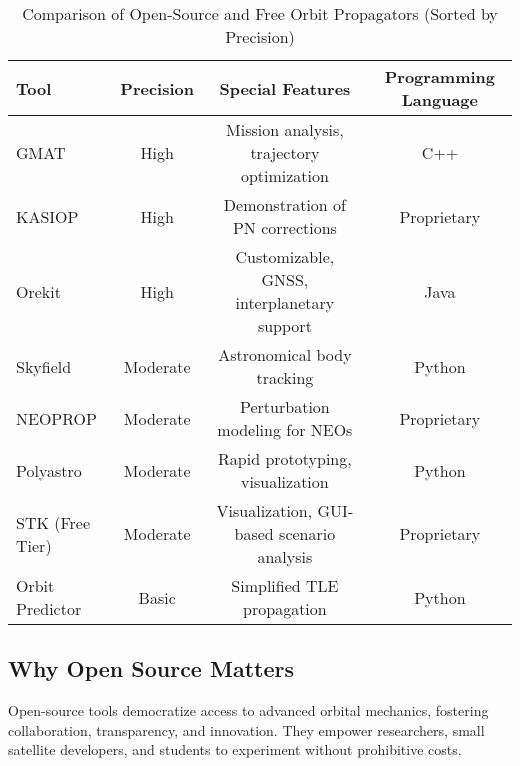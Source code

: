 
\begin{landscape}
\begin{table}[htbp]
\centering
\begin{tabular}{lccc}
\textbf{Tool} & \textbf{Precision} & \textbf{Special Features} & \textbf{Programming Language} \\
\hline
GMAT & High & Mission analysis, trajectory optimization & C++ \\
KASIOP & High & Demonstration of PN corrections & Proprietary \\
Orekit & High & Customizable, GNSS, interplanetary support & Java \\
Skyfield & Moderate & Astronomical body tracking & Python \\
NEOPROP & Moderate & Perturbation modeling for NEOs & Proprietary \\
Polyastro & Moderate & Rapid prototyping, visualization & Python \\
STK (Free Tier) & Moderate & Visualization, GUI-based scenario analysis & Proprietary \\
Orbit Predictor & Basic & Simplified TLE propagation & Python \\
\end{tabular}
\caption{Comparison of Open-Source and Free Orbit Propagators (Sorted by Precision)}
\label{tab:propagators_sorted}
\end{table}
\end{landscape}

\subsection{Why Open Source Matters}
Open-source tools democratize access to advanced orbital mechanics, fostering collaboration, transparency, and innovation. They empower researchers, small satellite developers, and students to experiment without prohibitive costs.


